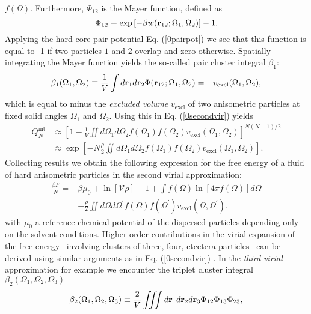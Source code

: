 \documentclass[amssymb]{revtex4}
\newcommand{\bfr}{{\bf r}}
\begin{document}
$f(\Omega)$. Furthermore, $\Phi_{12}$ is the Mayer function, defined as 
\begin{equation}
\Phi_{12}\equiv \exp\left[-\beta w(\bfr _{12}; \Omega_{1}, \Omega_{2})\right]-1.
\end{equation}
Applying the hard-core pair potential Eq. (\ref{0pairpot}) we see that this function is equal to -1  if
two particles $1$ and $2$ overlap and zero otherwise. 
Spatially integrating the Mayer function 
yields the so-called pair cluster integral $\beta _{1}$:
\begin{equation}
\beta_{1}(\Omega_{1},\Omega_{2})\equiv \frac{1}{V} \int d\bfr_{1}d \bfr_{2} \Phi(\bfr _{12}; \Omega_{1}, \Omega_{2})=-v_{\text{excl}}(\Omega_{1},\Omega_{2}),
\label{0cluster}
\end{equation}
which is equal to minus the {\em excluded volume} $v_{\text{excl}}$ of two anisometric particles at fixed
solid angles $\Omega_{1}$ and $\Omega_{2}$.
Using this in Eq. (\ref{0secondvir}) yields
\begin{align}
Q_{N}^{\text{int}}&\approx \left[1-\frac{1}{V} \iint d\Omega_{1} d\Omega_{2}
f(\Omega_{1})f(\Omega_{2})v_{\text{excl}}(\Omega_{1},\Omega_{2})\right]^{N(N-1)/2} \nonumber \\ 
&\approx \exp\left[-N \frac{\rho}{2}  \iint d\Omega_{1} d\Omega_{2}
f(\Omega_{1})f(\Omega_{2})v_{\text{excl}}(\Omega_{1},\Omega_{2})  \right].
\end{align}
Collecting results we obtain the following expression for the free energy
of a fluid of hard anisometric particles in the second virial approximation:
\begin{align}
\frac{\beta F}{N} =& \beta \mu_{0}+\ln\left[\mathcal{V}\rho\right]-1+
\int f(\Omega)\ln \left[4\pi f(\Omega)\right]d\Omega \nonumber \\
&+\frac{\rho}{2} \iint d\Omega d\Omega^{\prime} 
f(\Omega)f(\Omega^{\prime})v_{\text{excl}}(\Omega,\Omega^{\prime}). \label{0freetot}
\end{align}
with $\mu_{0}$ a reference chemical potential of the dispersed particles depending
only on the solvent conditions. Higher order contributions in the virial expansion of the free energy
--involving clusters of three, four, etcetera particles--
can be derived using similar arguments as in Eq. (\ref{0secondvir}) \cite{vankampen}.
In the {\em third virial} approximation for example we encounter the triplet cluster  
integral $\beta_{2}(\Omega_{1},\Omega_{2},\Omega_{3})$
\begin{equation}
\beta_{2}(\Omega_{1},\Omega_{2},\Omega_{3})\equiv \frac{2}{V}\iiint 
d\bfr_{1}d\bfr_{2}d\bfr_{3} \Phi_{12}\Phi_{13}\Phi_{23}, \label{0beta2}
\end{equation}
\end{document}
